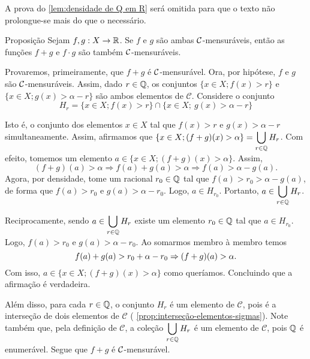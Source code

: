 A prova do \ref{lem:densidade de Q em R} será omitida para que o texto não prolongue-se mais do que o necessário.
\begin{env}{Proposição}
\label{prop:aritmetica-duas-funcoes}
    Sejam $f,g:X \to \mathbb{R}$. Se $f$ e $g$ são ambas $\operatorname{\mathcal{C}}$-mensuráveis, então as funções $f+g$ e $f\cdot g$ são também $\operatorname{\mathcal{C}}$-mensuráveis.
    \vspace{-0.2cm}
\end{env}
\begin{prova}
    Provaremos, primeiramente, que $f+g$ é $\operatorname{\mathcal{C}}$-mensurável.
    Ora, por hipótese, $f$ e $g$ são $\operatorname{\mathcal{C}}$-mensuráveis. 
    Assim, dado $r \in \operatorname{\mathbb{Q}}$, os conjuntos $\{x \in X; f(x) > r\}$ e 
    $\{x \in X; g(x) > \alpha -r\}$ são ambos elementos de $\mathcal{C}$.
    Considere o conjunto  
    \vspace{-0.2cm}
    $$H_r = \{x \in X; f(x) > r\} \cap \{x \in X;\ g(x) > \alpha -r\}$$
    
    \vspace{-0.2cm}
    Isto é, o conjunto dos elementos $x \in X$ tal que $f(x) 
    > r$ e $g(x) >\alpha -r$ simultaneamente.
    Assim, afirmamos que $\{x \in X; (f+g)(x) > \alpha\} = \displaystyle \bigcup_{r \in \operatorname{\mathbb{Q}}} H_r$. Com efeito, tomemos um elemento 
    $a \in \{x \in X; (f+g)(x) > \alpha\}$.
    Assim, 
    $$
    (f+g)(a) > \alpha 
    \Rightarrow 
    f(a) + g(a) > \alpha 
    \Rightarrow f(a) > \alpha - g(a). 
    $$
    Agora, por densidade, tome um racional $r_0 \in \operatorname{\mathbb{Q}}$ tal que  $f(a) > r_0 >\alpha - g(a)$, de forma que $f(a) > r_0$ e $g(a) > \alpha - r_0.$
    Logo, $a \in H_{r_0}$.
    Portanto, $ \displaystyle a \in \bigcup_{r \in \operatorname{\mathbb{Q}}} H_r$.
    
    Reciprocamente, sendo $ \displaystyle a \in \bigcup_{r \in \operatorname{\mathbb{Q}}} H_r$ existe um elemento $r_0 \in \operatorname{\mathbb{Q}}$ tal que $a \in H_{r_0}$.
    Logo, $f(a) > r_0$ e $g(a) > \alpha -r_0$.
    Ao somarmos membro à membro temos
    \vspace{-0.2cm}
    $$
    f(a) + g(a) > r_0 + \alpha -r_0
    \Rightarrow
    (f + g)(a) > \alpha. 
    \vspace{-0.2cm}
    $$
    Com isso, $a \in \{x \in X; (f +g)(x) > \alpha\}$ como queríamos.
    Concluindo que a afirmação é verdadeira. 
    
    Além disso, para cada $r \in \operatorname{\mathbb{Q}}$, o conjunto $H_r$ é um elemento de $\mathcal{C}$, pois é  a interseção de dois elementos de $\mathcal{C}$ ( \ref{prop:interseção-elementos-sigmas}).
    Note também que, pela definição de $\mathcal{C}$, a coleção $\displaystyle \bigcup_{r \in \operatorname{\mathbb{Q}}} H_r$ é um elemento de $\mathcal{C}$, pois $\operatorname{\mathbb{Q}}$ é enumerável.
    Segue que $f+g$ é $\operatorname{\mathcal{C}}$-mensurável.


\end{prova}
